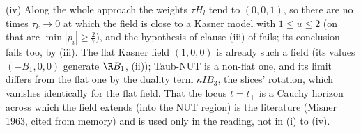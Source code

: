 (iv) Along the whole approach the weights $\tau H_{l}$ tend to $(0, 0, 1)$, so there are no times $\tau_{k} \to 0$ at which the field is close to a Kasner model with $1 \le u \le 2$ (on that arc $\min|p_{i}| \ge \tfrac27$), and the hypothesis of clause (iii) of  fails; its conclusion fails too, by (iii). The flat Kasner field $(1, 0, 0)$ is already such a field (its values $(-B_{1}, 0, 0)$ generate $\R B_{1}$, (ii)); Taub-NUT is a non-flat one, and its limit differs from the flat one by the duality term $\kappa IB_{3}$, the slices' rotation, which vanishes identically for the flat field. That the locus $t = t_{+}$ is a Cauchy horizon across which the field extends (into the NUT region) is the literature (Misner 1963, cited from memory) and is used only in the reading, not in (i) to (iv).
